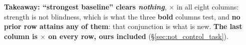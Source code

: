 \begin{table}[t]
\begin{threeparttable}
\caption{\textbf{Takeaway: ``strongest baseline'' clears \emph{nothing}}, $\times$ in all eight
columns: strength is not blindness, which is what the three \textbf{bold} columns test, and
\textbf{no prior row attains any of them}: that conjunction is what is new. \textbf{The last
column is $\times$ on every row, ours included} (\S\ref{sec:not_control_task}).}
\label{tab:novelty}
\setlength{\tabcolsep}{1.5pt}
\setlength{\aboverulesep}{0.5pt}\setlength{\belowrulesep}{0.5pt}

\end{threeparttable}
\end{table}

